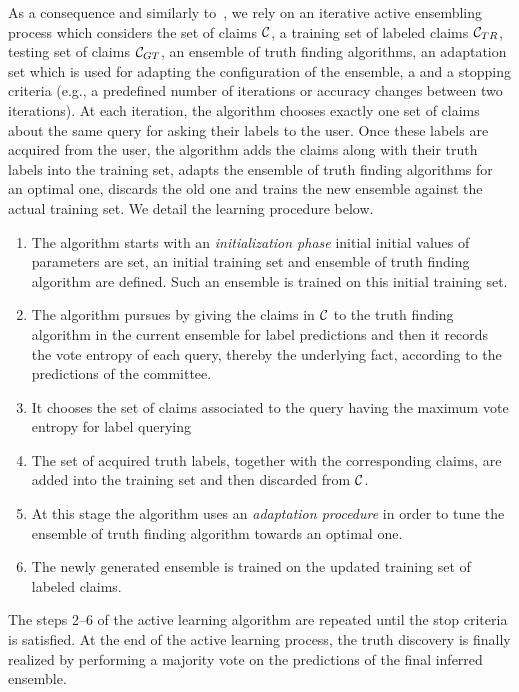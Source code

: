 As a consequence and similarly to~\cite{Lu15}, we rely on an iterative active ensembling process which considers the set of claims $\mathcal{C}{}$, 
a training set of labeled claims $\mathcal{C}_{TR}$, testing set of claims $\mathcal{C}_{GT}$, an ensemble of truth finding algorithms, an adaptation
set which is used for adapting the configuration of the ensemble, a  and a stopping criteria (e.g., a predefined number of iterations or accuracy changes
between two iterations). At each iteration, the algorithm chooses exactly one set of claims about the same query for asking their labels to the user. Once
these labels are acquired from the user, the algorithm  adds the claims along with their truth labels into the training set, adapts the ensemble of truth 
finding algorithms for an optimal one, discards the old one and trains the new ensemble against the actual training set. We detail the learning procedure below.

\begin{enumerate}
\item The algorithm starts with an \emph{initialization phase} initial initial values of parameters are set, an initial training set and ensemble of truth finding
algorithm are defined. Such an ensemble is trained on this initial training set.
 \item The algorithm pursues by giving the claims in $\mathcal{C}{}$ to the truth finding algorithm in the current ensemble for label predictions and then 
 it records the vote entropy of each query, thereby the underlying fact, according to the predictions of the committee.
 \item It chooses the set of claims associated to the query having the maximum vote entropy for label querying
 \item The set of acquired truth labels, together with the corresponding claims, are added into the training set and then discarded from $\mathcal{C}{}$.
 \item At this stage the algorithm uses an \emph{adaptation procedure} in order to tune the ensemble of truth finding algorithm towards an optimal one.
 \item The newly generated ensemble is trained on the updated training set of labeled claims.
\end{enumerate}

The steps 2--6 of the active learning algorithm are repeated until the stop criteria is satisfied. 
At the end of the active learning process, the truth discovery is finally realized by performing 
a majority vote on the predictions of the final inferred ensemble. 
